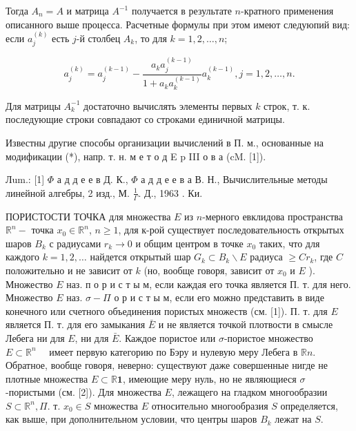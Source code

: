 \documentclass[10pt]{article}
\begin{document}
Тогда $A_{n}=A$ и матрица $A^{-1}$ получается в результате $n$-кратного применения описанного выше процесса. Расчетные формулы при этом имеют следуюпий вид: если $a_{j}^{(k)}$ есть $j$-й столбец $A_{k}$, то для $k=1,2, \ldots, n$;



\[

a_{j}^{(k)}=a_{j}^{(k-1)}-\frac{a_{k} a_{j}^{(k-1)}}{1+a_{k} a_{k}^{(k-1)}} a_{k}^{(k-1)}, j=1,2, \ldots, n .

\]



Для матрицы $A_{k}^{-1}$ достаточно вычислять элементы первых $k$ строк, т. к. последующие строки совпадают со строками единичной матрицы.



Известны другие способы организации вычислений в П. м., основанные на модификации (*), напр. т. н. м е т о д E p III о в а (cM. [1]).



Лum.: [1] $\Phi$ а д д е е в Д. К., $\Phi$ а д д е е в а В. Н., Вычислительные методы линейной алгебры, 2 изд., М. $\frac{1}{\Gamma}$. Д., 1963 . Ки.



ПОРИСТОСТИ ТОЧКА для множества $E$ из $n$-мерного евклидова пространства $\mathbb{R}^{n}-$ точка $x_{0} \in \mathbb{R}^{n}$, $n \geqslant 1$, для к-рой существует последовательность открытых шаров $B_{k}$ с радиусами $r_{k} \rightarrow 0$ и общим центром в точке $x_{0}$ таких, что для каждого $k=1,2, \ldots$ найдется открытый шар $G_{k} \subset B_{k} \backslash E$ радиуса $\geqslant C r_{k}$, где $C$ положительно и не зависит от $k$ (но, вообще говоря, зависит от $x_{0}$ и $E$ ). Множество $E$ наз. п о р и с т ы м, если каждая его точка является П. т. для него. Множество $E$ наз. $\sigma-\Pi$ о р и с т ы м, если его можно представить в виде конечного или счетного объединения пористых множеств (см. [1]). П. т. для $E$ является П. т. для его замыкания $\bar{E}$ и не является точкой плотвости в смысле Лебега ни для $E$, ни для $\bar{E}$. Каждое пористое или $\sigma$-пористое множество $E \subset \mathbb{R}^{n} \quad$ имеет первую категорию по Бэру и нулевую меру Лебега в $\mathbb{R} n$. Обратное, вообще говоря, неверно: существуют даже совершенные нигде не плотные множества $E \subset \mathbb{R} \mathbf{1}$, имеющие меру нуль, но не являющиеся $\sigma$-пористыми (см. [2]). Для множества $E$, лежащего на гладком многообразии $S \subset \mathbb{R}^{n}, \Pi$. т. $x_{0} \in S$ множества $E$ относительно многообразия $S$ определяется, как выше, при дополнительном условии, что центры шаров $B_{k}$ лежат на $S$.
\end{document}
